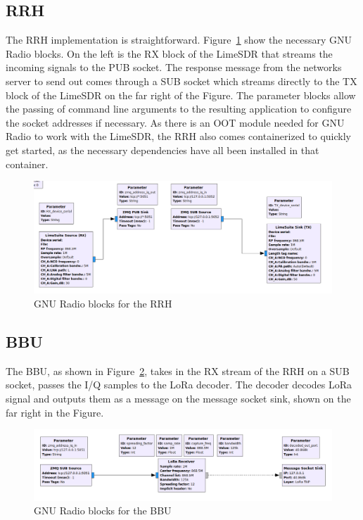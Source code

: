\subsection{RRH}
The RRH implementation is straightforward. Figure~\ref{fig:RRH_impl} show the necessary 
GNU Radio blocks. On the left is the RX block of the LimeSDR that streams the incoming signals to the 
PUB socket. The response message from the networks server to send out comes through a SUB socket which 
streams directly to the TX block of the LimeSDR on the far right of the Figure.
The parameter blocks allow the passing of command line arguments to the resulting application to configure
the socket addresses if necessary. As there is an OOT module needed for GNU Radio to work with the LimeSDR, the 
RRH also comes containerized to quickly get started, as the necessary dependencies have all been installed
in that container.
\begin{figure}[h]
    \centering
    \includegraphics[width=1\textwidth]{figures/RRH_impl.png}
    \caption{GNU Radio blocks for the RRH}
    \label{fig:RRH_impl}
\end{figure}

\subsection{BBU}
The BBU, as shown in Figure~\ref{fig:BBU_impl}, takes in the RX stream of the RRH on a SUB socket,
passes the I/Q samples to the LoRa decoder. The decoder decodes LoRa signal and outputs them as a 
message on the message socket sink, shown on the far right in the Figure.


\begin{figure}[h]
    \centering
    \includegraphics[width=1\textwidth]{figures/BBU_impl.png}
    \caption{GNU Radio blocks for the BBU}
    \label{fig:BBU_impl}
\end{figure}


